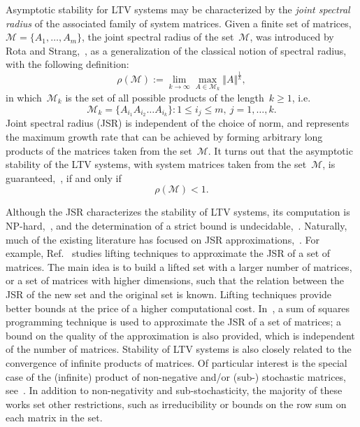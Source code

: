 \documentclass[draftclsnofoot, onecolumn, 12pt]{IEEEtran}
\begin{document}
Asymptotic stability for LTV systems may be characterized by the \textit{joint spectral radius} of the associated family of system matrices. Given a finite set of matrices,~$\mathcal{M}=\{{A}_{1},\ldots,{A}_{m}\}$, the joint spectral radius of the set~$\mathcal{M}$, was introduced by Rota and Strang,~\cite{rota1960note}, as a generalization of the classical notion of spectral radius, with the following definition:
\begin{equation*}\label{2}
\rho(\mathcal{M}):=\lim_{k \rightarrow \infty} \max\limits_{A \in {\mathcal{M}}_k } {\Vert {A}\Vert}^{\frac{1}{k}},
\end{equation*}
in which~${\mathcal{M}}_k$ is the set of all possible products of the length~$k \geq 1$, i.e.
\begin{equation*}
{\mathcal{M}}_k =\{A_{i_1} A_{i_2} \ldots A_{i_k} \}: 1 \leq i_j \leq m,~j=1,\ldots,k.
\end{equation*}
Joint spectral radius (JSR) is independent of the choice of norm, and represents the maximum growth rate that can be achieved by forming arbitrary long products of the matrices taken from the set~${\mathcal{M}}$. It turns out that the asymptotic stability of the LTV systems, with system matrices taken from the set~$\mathcal{M}$, is guaranteed,~\cite{parrilo2008approximation}, if and only if
\begin{equation*}
\rho(\mathcal{M}) < 1.
\end{equation*}
  
Although the JSR characterizes the stability of LTV systems, its computation is NP-hard,~\cite{tsitsiklis1997lyapunov}, and the determination of a strict bound is undecidable,~\cite{blondel2000boundedness}. Naturally, much of the existing literature has focused on JSR approximations,~\cite{parrilo2008approximation,gripenberg1996computing,blondel2000boundedness,jungers2009joint,blondel2005computationally,tsitsiklis1997lyapunov,qu2005products,touri2011product}. For example, Ref.~\cite{blondel2005computationally} studies lifting techniques  to approximate the JSR of a set of matrices. The main idea is to build a lifted set with a larger number of matrices, or a set of matrices with higher dimensions, such that the relation between the JSR of the new set and the original set is known. Lifting techniques provide better bounds at the price of a higher computational cost. In~\cite{parrilo2008approximation}, a sum of squares programming technique is used  to approximate the JSR of a set of matrices; a bound on the quality of the approximation is also provided, which is independent of the number of matrices. Stability of LTV systems is also closely related to the convergence of infinite products of matrices. Of particular interest is the special case of the (infinite) product of non-negative and/or (sub-) stochastic matrices, see~\cite{guu2003convergence,daubechies1992sets,bru1994convergence,beyn1997infinite,hartfiel1974infinite,pullman1966infinite,kochkarev1995continuous,Elsner1997133}. In addition to non-negativity and sub-stochasticity, the majority of these works set other restrictions, such as irreducibility or bounds on the row sum on each matrix in the set. 
\end{document}
